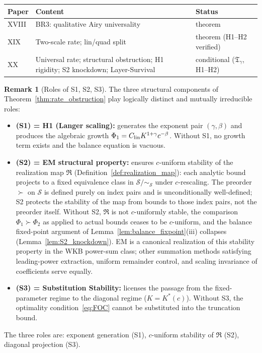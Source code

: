 \documentclass[12pt,a4paper]{amsart}
\theoremstyle{definition}
\newtheorem{remark}[theorem]{Remark}
\begin{document}

\begin{center}
\renewcommand{\arraystretch}{1.3}
\begin{tabular}{l l l}
\toprule
\textbf{Paper} & \textbf{Content} & \textbf{Status} \\
\midrule
XVIII & BR3: qualitative Airy universality & theorem \\
XIX   & Two-scale rate; lin/quad split     & theorem (H1--H2 verified) \\
XX    & Universal rate; structural obstruction;
        H1 rigidity; S2 knockdown; Layer-Survival
      & conditional ($\mathfrak{T}_\gamma$, H1--H2) \\
\bottomrule
\end{tabular}
\end{center}

\begin{remark}[Roles of S1, S2, S3]
\label{rem:S123_roles}
The three structural components of Theorem~\ref{thm:rate_obstruction}
play logically distinct and mutually irreducible roles:
\begin{itemize}[nosep]
  \item \textbf{(S1) = H1 (Langer scaling):}
    generates the exponent pair $(\gamma,\beta)$ and produces
    the algebraic growth $\Phi_1 = C_{\rm lin}K^{1+\gamma}c^{-\beta}$.
    Without S1, no growth term exists and the balance equation is vacuous.
  \item \textbf{(S2) = EM structural property:}
    ensures $c$-uniform stability of the realization map $\mathfrak{R}$
    (Definition~\ref{def:realization_map}):
    each analytic bound projects to a fixed equivalence class in
    $\mathcal{S}/\!\sim_{\mathcal{S}}$ under $c$-rescaling.
    The preorder $\succ$ on $\mathcal{S}$ is defined purely on
    index pairs and is unconditionally well-defined;
    S2 protects the stability of the map from bounds to those index pairs,
    not the preorder itself.
    Without S2, $\mathfrak{R}$ is not $c$-uniformly stable,
    the comparison $\Phi_1 \succ \Phi_2$ as applied to actual bounds
    ceases to be $c$-uniform,
    and the balance fixed-point argument of
    Lemma~\ref{lem:balance_fixpoint}(iii) collapses
    (Lemma~\ref{lem:S2_knockdown}).
    EM is a canonical realization of this stability property
    in the WKB power-sum class; other summation methods satisfying
    leading-power extraction, uniform remainder control, and scaling
    invariance of coefficients serve equally.
  \item \textbf{(S3) = Substitution Stability:}
    licenses the passage from the fixed-parameter regime
    to the diagonal regime ($K = K^*(c)$).
    Without S3, the optimality condition~\eqref{eq:FOC}
    cannot be substituted into the truncation bound.
\end{itemize}
The three roles are:\quad
exponent generation (S1),\quad
$c$-uniform stability of $\mathfrak{R}$ (S2),\quad
diagonal projection (S3).
\end{remark}
\end{document}
